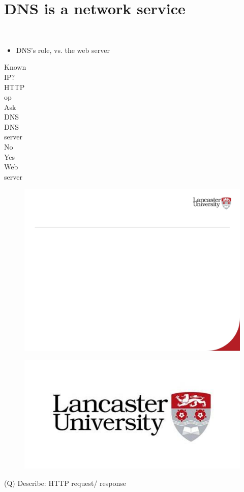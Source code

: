\documentclass[12pt]{article}
\begin{document}
\section{DNS is a network service}
\\
\begin{itemize}
  \item DNS’s role, vs. the web server
\end{itemize}
Known \\
IP?\\
HTTP \\
op\\
Ask \\
DNS\\
DNS \\
server\\
No\\
Yes\\
Web \\
server\\
\begin{figure}[H]
\includegraphics[width=0.5\linewidth]{page21-image-1.png}
\end{figure}
\begin{figure}[H]
\includegraphics[width=0.5\linewidth]{page21-image-2.png}
\end{figure}
\clearpage
(Q)
Describe: HTTP request/ response
\clearpage
\end{document}
